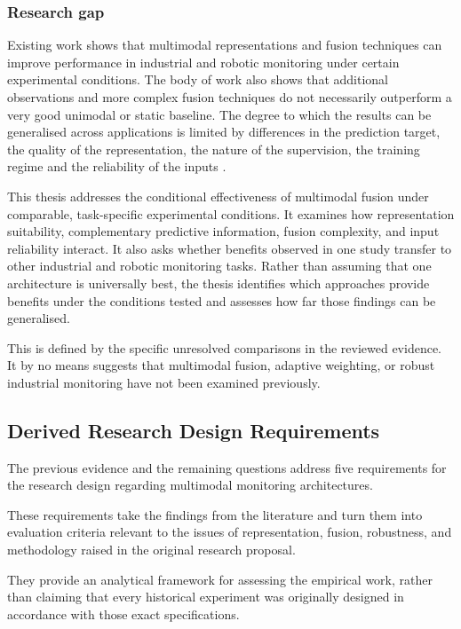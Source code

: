 \subsubsection*{Research gap}

Existing work shows that multimodal representations and fusion techniques can improve performance in
industrial and robotic monitoring under certain experimental conditions. The body of work also shows
that additional observations and more complex fusion techniques do not necessarily outperform a very
good unimodal or static baseline. The degree to which the results can be generalised across
applications is limited by differences in the prediction target, the quality of the representation,
the nature of the supervision, the training regime and the reliability of the inputs
\parencite{Wang2020What,Hua2026Weld,Goodarzi2023Deep,Thoduka2024Handover,Zhang2023QMF}.

This thesis addresses the conditional effectiveness of multimodal fusion under comparable,
task-specific experimental conditions. It examines how representation suitability, complementary
predictive information, fusion complexity, and input reliability interact. It also asks whether
benefits observed in one study transfer to other industrial and robotic monitoring tasks. Rather
than assuming that one architecture is universally best, the thesis identifies which approaches
provide benefits under the conditions tested and assesses how far those findings can be generalised.

This is defined by the specific unresolved comparisons in the reviewed evidence. It by no means
suggests that multimodal fusion, adaptive weighting, or robust industrial monitoring have not been
examined previously.

\subsection{Derived Research Design Requirements}

The previous evidence and the remaining questions address five requirements for the research design
regarding multimodal monitoring architectures.

These requirements take the findings from the literature and turn them into evaluation criteria
relevant to the issues of representation, fusion, robustness, and methodology raised in the original
research proposal.

They provide an analytical framework for assessing the empirical work, rather than claiming that
every historical experiment was originally designed in accordance with those exact specifications.

